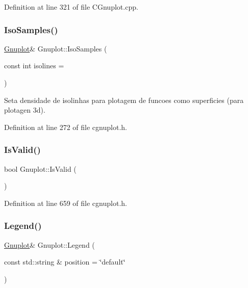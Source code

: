Definition at line 321 of file C\+Gnuplot.\+cpp.

\mbox{\label{class_gnuplot_a215f314f3bcc2c869e7379a9728e5f95}} 
\subsubsection{\texorpdfstring{Iso\+Samples()}{IsoSamples()}}
{\footnotesize\ttfamily \hyperlink{class_gnuplot}{Gnuplot}\& Gnuplot\+::\+Iso\+Samples (\begin{DoxyParamCaption}\item[{const int}]{isolines = {} }\end{DoxyParamCaption})\hspace{0.3cm}{\ttfamily [inline]}}



Seta densidade de isolinhas para plotagem de funcoes como superficies (para plotagen 3d). 



Definition at line 272 of file cgnuplot.\+h.

\mbox{\label{class_gnuplot_af1af0e2a0b3661df825b4e7b1f7e8d94}} 
\subsubsection{\texorpdfstring{Is\+Valid()}{IsValid()}}
{\footnotesize\ttfamily bool Gnuplot\+::\+Is\+Valid (\begin{DoxyParamCaption}{ }\end{DoxyParamCaption})\hspace{0.3cm}{\ttfamily [inline]}}



Definition at line 659 of file cgnuplot.\+h.

\mbox{\label{class_gnuplot_aec3037a558d26535e3847c52d1b120aa}} 
\subsubsection{\texorpdfstring{Legend()}{Legend()}\hspace{0.1cm}{\footnotesize\ttfamily [1/2]}}
{\footnotesize\ttfamily \hyperlink{class_gnuplot}{Gnuplot}\& Gnuplot\+::\+Legend (\begin{DoxyParamCaption}\item[{const std\+::string \&}]{position = {\ttfamily \char`\"{}default\char`\"{}} }\end{DoxyParamCaption})\hspace{0.3cm}{\ttfamily [inline]}}



